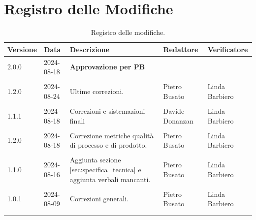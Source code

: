 \documentclass[8pt]{article}
\begin{document}
\section*{Registro delle Modifiche}
\begin{table}[ht!]
    \hypersetup{hidelinks}	
	\centering
	\begin{tabular}{p{1.2cm} p{2cm} p{5cm} p{3cm} p{3cm}}
		\toprule
		\textbf{Versione}& \textbf{Data} & \textbf{Descrizione} & \textbf{Redattore} & \textbf{Verificatore} \\
		\midrule
            2.0.0 & 2024-08-18 & \textbf{Approvazione per PB} & &  \\\\
            1.2.0 & 2024-08-24 & Ultime correzioni. & Pietro Busato & Linda Barbiero \\\\
            1.1.1 & 2024-08-18 & Correzioni e sistemazioni finali & Davide Donanzan & Linda Barbiero \\\\
            1.2.0 & 2024-08-18 & Correzione metriche qualità di processo e di prodotto. & Pietro Busato & Linda Barbiero \\\\
            1.1.0 & 2024-08-16 & Aggiunta sezione \ref{sec:specifica_tecnica} e aggiunta verbali mancanti. & Pietro Busato & Linda Barbiero \\\\
			1.0.1 & 2024-08-09 & Correzioni generali. & Pietro Busato & Linda Barbiero \\\\
 		    \\ %
		\bottomrule
	\end{tabular}
	\caption{Registro delle modifiche.}
	\label{table:Registro delle modifiche}
\end{table}
\clearpage
\end{document}
